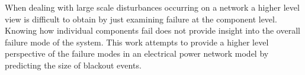 When dealing with large scale disturbances occurring on a network a higher level view is difficult to obtain by just examining failure at the component level. Knowing how individual components fail does not provide insight into the overall failure mode of the system. This work attempts to provide a higher level perspective of the failure modes in an electrical power network model by predicting the size of blackout events.
